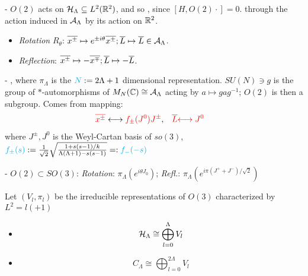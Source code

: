 {
    \color{gray}
    
    - $O(2)$ acts on $\mathcal H_\Lambda \subseteq L^2(\mathbb{R}^2)$, and so , since $[H, O(2)\cdot ] = 0$. through the action induced in $\mathcal A_\Lambda$ by its action on $\mathbb{R}^2$.
        \begin{itemize}
            
        \item \textit{Rotation} $R_\theta$: $\overline{x^\pm} \mapsto e^{\pm i \theta} \overline{x ^\pm}; \overline{L} \mapsto \overline{L} \in \mathcal A_\Lambda$.
        
        \item \textit{Reflection}: $\overline{x^\pm} \mapsto -\overline{x^\mp}; \overline{L} \mapsto -\overline{L}$.
        
        \end{itemize}
    
    - , where $\pi_\Lambda$ is the $\textcolor{cyan}{N} := 2 \Lambda + 1$ dimensional representation. $SU(N) \ni g$ is the group of $*$-automorphisms of $M_N(\mathbb{C}) \cong \mathcal A_\Lambda$ acting by $a \mapsto g a g^{-1}$; $O(2)$ is then a subgroup. Comes from mapping:
    \begin{align}
        \textcolor{red}{\overline{x^\pm}} &\longleftrightarrow \textcolor{red}{f_\pm (J^0) J^\pm}, &
        \textcolor{red}{\overline{L} }& \textcolor{red}{\longleftrightarrow J^0}
    \end{align}
    where $J^\pm, J^0$ is the Weyl-Cartan basis of $so(3)$, $\textcolor{cyan}{f_\pm(s)} := \frac{1}{\sqrt{2}} \sqrt{\frac{1 + s(s-1)/k}{\Lambda (\Lambda + 1) - s(s-1)}} =: \textcolor{cyan}{f_-(-s)}$%

    - $O(2) \subset SO(3)$: \textit{Rotation}: $\pi_\Lambda(e^{i \theta J_0})$; \textit{Refl.}: $\pi_\Lambda(e^{i\pi (J^+ + J^-)/\sqrt{2}})$
    
    \lin 
    
    Let $(V_l, \pi_l)$ be the irreducible representations of $O(3)$ characterized by $L^2 = l(+1)$
    
        \begin{itemize}
        
        \item  \begin{equation}
            \mathcal H_\Lambda \cong \bigoplus_{l = 0}^\Lambda V_l
        \end{equation}
        
        \item \begin{equation}
            C_\Lambda \cong \bigoplus_{l = 0}^{2\Lambda} V_l
        \end{equation}
        
        \end{itemize}
        
}

